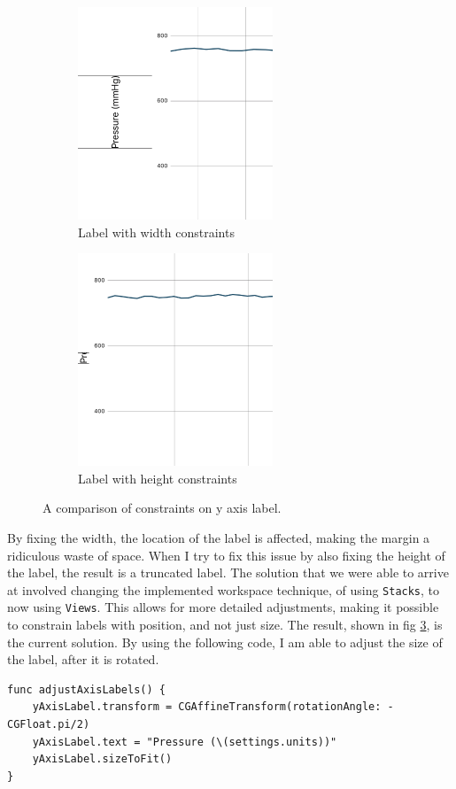 \documentclass[onecolumn, draftclsnofoot,10pt, compsoc]{IEEEtran}
\begin{document}
\begin{figure}[H]
\centering
\begin{subfigure}{.5\textwidth}
  \centering
  \includegraphics[width=.4\linewidth]{widthAxis}
  \caption{Label with width constraints}
  \label{fig:width}
\end{subfigure}%
\begin{subfigure}{.5\textwidth}
  \centering
  \includegraphics[width=.4\linewidth]{heightAxis}
  \caption{Label with height constraints}
  \label{fig:height}
\end{subfigure}
\caption{A comparison of constraints on y axis label.}
\label{fig:comparison}
\end{figure}

By fixing the width, the location of the label is affected, making the margin a ridiculous waste of space.
When I try to fix this issue by also fixing the height of the label, the result is a truncated label.
The solution that we were able to arrive at involved changing the implemented workspace technique, of using \texttt{Stacks}, to now using \texttt{Views}.
This allows for more detailed adjustments, making it possible to constrain labels with position, and not just size.
The result, shown in fig \ref{fig:comparison}, is the current solution.
By using the following code, I am able to adjust the size of the label, after it is rotated.

\begin{lstlisting}
func adjustAxisLabels() {
    yAxisLabel.transform = CGAffineTransform(rotationAngle: -CGFloat.pi/2)
    yAxisLabel.text = "Pressure (\(settings.units))"
    yAxisLabel.sizeToFit()
}
\end{lstlisting}
\end{document}
